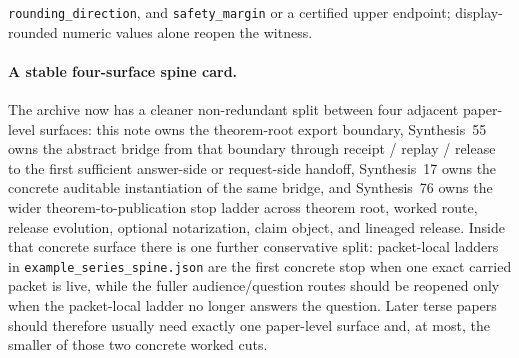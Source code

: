 \documentclass[11pt]{article}
\begin{document}
\nolinkurl{rounding_direction}, and \nolinkurl{safety_margin} or a certified upper endpoint; display-rounded numeric values alone reopen the witness.

\paragraph{A stable four-surface spine card.}
The archive now has a cleaner non-redundant split between four adjacent paper-level surfaces: this note owns the theorem-root export boundary, Synthesis~55 owns the abstract bridge from that boundary through receipt / replay / release to the first sufficient answer-side or request-side handoff, Synthesis~17 owns the concrete auditable instantiation of the same bridge, and Synthesis~76 owns the wider theorem-to-publication stop ladder across theorem root, worked route, release evolution, optional notarization, claim object, and lineaged release. Inside that concrete surface there is one further conservative split: packet-local ladders in \nolinkurl{example\_series\_spine.json} are the first concrete stop when one exact carried packet is live, while the fuller audience/question routes should be reopened only when the packet-local ladder no longer answers the question. Later terse papers should therefore usually need exactly one paper-level surface and, at most, the smaller of those two concrete worked cuts.\cite{series:workedexample,series:seriesspines,series:theoremtopublicationspine}
\end{document}
